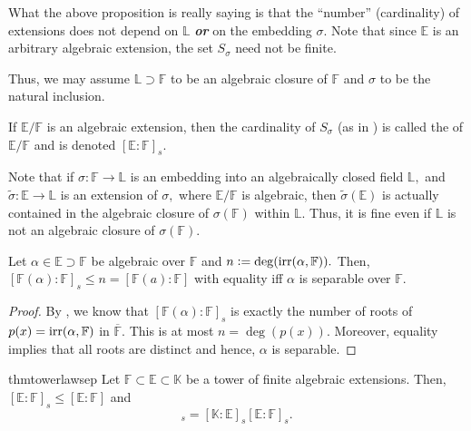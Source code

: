 \begin{rem}
    What the above proposition is really saying is that the ``number'' (cardinality) of extensions does not depend on $\mathbb{L}$ \textbf{\emph{or}} on the embedding $\sigma.$ Note that since $\mathbb{E}$ is an arbitrary algebraic extension, the set $S_\sigma$ need not be finite. 

    Thus, we may assume $\mathbb{L} \supset \mathbb{F}$ to be an algebraic closure of $\mathbb{F}$ and $\sigma$ to be the natural inclusion.
\end{rem}

\begin{defn}%
    If $\mathbb{E}/\mathbb{F}$ is an algebraic extension, then the cardinality of $S_\sigma$ (as in ) is called the  of $\mathbb{E}/\mathbb{F}$ and is denoted $[\mathbb{E} : \mathbb{F}]_s.$
\end{defn}

\begin{rem}
    Note that if $\sigma : \mathbb{F} \to \mathbb{L}$ is an embedding into an algebraically closed field $\mathbb{L},$ and $\widetilde{\sigma} : \mathbb{E} \to \mathbb{L}$ is an extension of $\sigma,$ where $\mathbb{E}/\mathbb{F}$ is algebraic, then $\widetilde{\sigma}(\mathbb{E})$ is actually contained in the algebraic closure of $\sigma(\mathbb{F})$ within $\mathbb{L}.$ Thus, it is fine even if $\mathbb{L}$ is not an algebraic closure of $\sigma(\mathbb{F}).$
\end{rem}

\begin{prop} \label{prop:sepdeglessthannordeg}
    Let $\alpha \in \mathbb{E} \supset \mathbb{F}$ be algebraic over $\mathbb{F}$ and $n \vcentcolon= \deg(\operatorname{irr}(\alpha, \mathbb{F})).$ Then, $[\mathbb{F}(\alpha) : \mathbb{F}]_s \le n = [\mathbb{F}(a) : \mathbb{F}]$ with equality iff $\alpha$ is separable over $\mathbb{F}.$
\end{prop}
\begin{proof} 
    By , we know that $[\mathbb{F}(\alpha) : \mathbb{F}]_s$ is exactly the number of roots of $p(x) = \operatorname{irr}(\alpha, \mathbb{F})$ in $\overline{\mathbb{F}}.$ This is at most $n = \deg(p(x)).$ Moreover, equality implies that all roots are distinct and hence, $\alpha$ is separable.
\end{proof}

\begin{restatable}{thm}{towerlawsep}
\label{thm:towerlawsep}
    Let $\mathbb{F} \subset \mathbb{E} \subset \mathbb{K}$ be a tower of finite algebraic extensions. Then, $[\mathbb{E} : \mathbb{F}]_s \le [\mathbb{E} : \mathbb{F}]$ and
    \begin{equation*} 
        [\mathbb{K} : \mathbb{F}]_s = [\mathbb{K} : \mathbb{E}]_s [\mathbb{E} : \mathbb{F}]_s.
    \end{equation*} \hfill\hyperref[thm:towerlawsep2]{\downsym}
\end{restatable}

